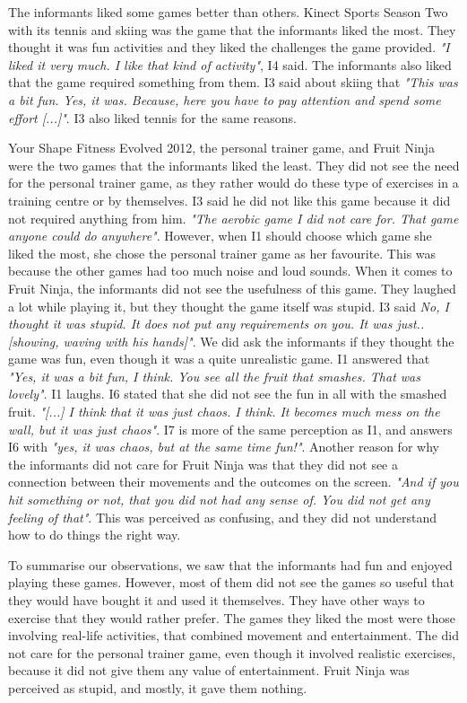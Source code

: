 The informants liked some games better than others. Kinect Sports Season Two with its tennis and skiing was the game that the informants liked the most. They thought it was fun activities and they liked the challenges the game provided. \emph{"I liked it very much. I like that kind of activity"}, I4 said. The informants also liked that the game required something from them. I3 said about skiing that \emph{"This was a bit fun. Yes, it was. Because, here you have to pay attention and spend some effort [...]"}. I3 also liked tennis for the same reasons.  

Your Shape Fitness Evolved 2012, the personal trainer game, and Fruit Ninja were the two games that the informants liked the least. They did not see the need for the personal trainer game, as they rather would do these type of exercises in a training centre or by themselves. I3 said he did not like this game because it did not required anything from him. \emph{"The aerobic game I did not care for. That game anyone could do anywhere"}. However, when I1 should choose which game she liked the most, she chose the personal trainer game as her favourite. This was because the other games had too much noise and loud sounds. When it comes to Fruit Ninja, the informants did not see the usefulness of this game. They laughed a lot while playing it, but they thought the game itself was stupid. I3 said \emph{No, I thought it was stupid. It does not put any requirements on you. It was just.. [showing, waving with his hands]"}. We did ask the informants if they thought the game was fun, even though it was a quite unrealistic game. I1 answered that \emph{"Yes, it was a bit fun, I think. You see all the fruit that smashes. That was lovely"}. I1 laughs. I6 stated that she did not see the fun in all with the smashed fruit. \emph{"[...] I think that it was just chaos. I think. It becomes much mess on the wall, but it was just chaos"}. I7 is more of the same perception as I1, and answers I6 with \emph{"yes, it was chaos, but at the same time fun!"}. Another reason for why the informants did not care for Fruit Ninja was that they did not see a connection between their movements and the outcomes on the screen. \emph{"And if you hit something or not, that you did not had any sense of. You did not get any feeling of that"}. This was perceived as confusing, and they did not understand how to do things the right way. 

To summarise our observations, we saw that the informants had fun and enjoyed playing these games. However, most of them did not see the games so useful that they would have bought it and used it themselves. They have other ways to exercise that they would rather prefer. The games they liked the most were those involving real-life activities, that combined movement and entertainment. The did not care for the personal trainer game, even though it involved realistic exercises, because it did not give them any value of entertainment. Fruit Ninja was perceived as stupid, and mostly, it gave them nothing. 

